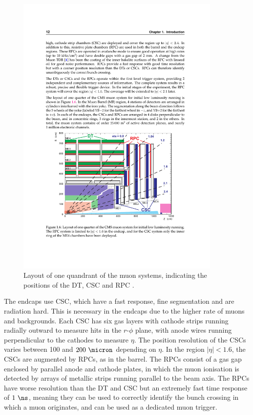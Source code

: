 \begin{figure}[htbp]
   \includegraphics[width=0.9\textwidth]{plots/detector/muon_layout.pdf}
\caption{Layout of one quandrant of the muon systems, indicating the positions
of the \ac{DT}, \ac{CSC} and \ac{RPC} \cite{TDR}.}
\label{fig:muondetectors}
\end{figure}

The endcaps use \ac{CSC}, which have a fast response, fine segmentation and are
radiation hard. This is necessary in the endcaps due to the higher rate of muons
and backgrounds. Each \ac{CSC} has six gas layers with cathode strips running
radially outward to measure hits in the $r$-$\phi$ plane, with anode wires
running perpendicular to the cathodes to measure $\eta$. The position resolution
of the \ac{CSC}s varies between 100 and $200~\micron$ depending on $\eta$. In the region
$|\eta|<1.6$, the \ac{CSC}s are augmented by \ac{RPC}s, as in the barrel. The
\ac{RPC}s consist of a gas gap enclosed by parallel anode and cathode plates, in
which the muon ionisation is detected by arrays of metallic strips running
parallel to the beam axis. The \ac{RPC}s have worse resolution than the \ac{DT}
and \ac{CSC} but an extremely fast time response of
$1~\ns$, meaning they can be used to correctly identify the bunch crossing in
which a muon originates, and can be used as a dedicated muon trigger.


